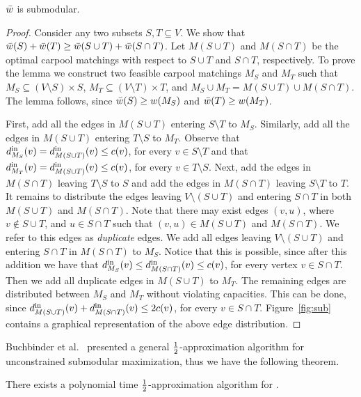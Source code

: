 \begin{lemma}
$\barw$ is submodular.
\end{lemma}
\begin{proof}
Consider any two subsets $S, T \subseteq V$.  We show that $\barw(S)
+ \barw(T) \geq \barw(S \cup T) + \barw(S \cap T)$.
%
Let $M(S \cup T)$ and $M(S \cap T)$ be the optimal carpool matchings
with respect to $S \cup T$ and $S \cap T$, respectively.
%
To prove the lemma we construct two feasible carpool matchings $M_S$
and $M_T$ such that $M_S \subseteq (V \setminus S) \times S$,
$M_T \subseteq (V \setminus T) \times T$, and $M_S \cup M_T = M(S \cup
T) \cup M(S \cap T)$.
%
The lemma follows, since $\barw(S) \geq w(M_S)$ and $\barw(T) \geq
w(M_T)$.

First, add all the edges in $M(S \cup T)$ entering $S \setminus T$ to
$M_S$.  Similarly, add all the edges in $M(S \cup T)$ entering
$T \setminus S$ to $M_T$.  Observe that $\din[M_S](v) = \din[M(S \cup
T)](v) \leq c(v)$, for every $v \in S \setminus T$ and that
$\din[M_T](v) = \din[M(S \cup T)](v) \leq c(v)$, for every $v \in
T \setminus S$.
%
Next, add the edges in $M(S \cap T)$ leaving $T \setminus S$ to $S$
and add the edges in $M(S \cap T)$ leaving $S \setminus T$ to $T$.
%
It remains to distribute the edges leaving $V \setminus (S \cup T)$
and entering $S \cap T$ in both $M(S \cup T)$ and $M(S \cap T)$.  Note
that there may exist edges $(v,u)$, where $v \not\in S \cup T$, and
$u \in S \cap T$ such that $(v,u) \in M(S \cup T)$ and $M(S \cap T)$.
We refer to this edges as \emph{duplicate} edges.
%
We add all edges leaving $V \setminus (S \cup T)$ and entering $S \cap
T$ in $M(S \cap T)$ to $M_S$.  Notice that this is possible, since
after this addition we have that $\din[M_S](v) \leq \din[M(S \cap
T)](v) \leq c(v)$, for every vertex $v \in S \cap T$.
%
Then we add all duplicate edges in $M(S \cup T)$ to $M_T$.
%
The remaining edges are distributed between $M_S$ and $M_T$ without
violating capacities.  This can be done, since $\din[M(S \cup T)](v)
+ \din[M(S \cap T)](v) \leq 2c(v)$, for every $v \in S \cap T$.
%
Figure~\ref{fig:sub} contains a graphical representation of the above
edge distribution.
\end{proof}

Buchbinder et al.~\cite{BFNS15,buchbinder2016deterministic} presented
a general $\half$-approximation algorithm for unconstrained
submodular maximization, thus we have the following theorem.

\begin{theorem}
There exists a polynomial time $\half$-approximation algorithm
for \carpool.
\end{theorem}

